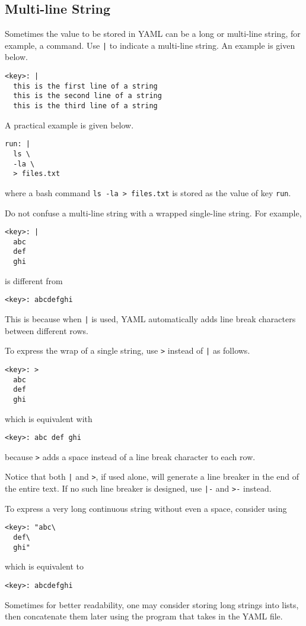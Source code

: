 \subsection{Multi-line String}

Sometimes the value to be stored in YAML can be a long or multi-line string, for example, a command. Use \texttt{|} to indicate a multi-line string. An example is given below.
\begin{lstlisting}
<key>: |
  this is the first line of a string
  this is the second line of a string
  this is the third line of a string
\end{lstlisting}
A practical example is given below.
\begin{lstlisting}
run: |
  ls \
  -la \
  > files.txt
\end{lstlisting}
where a bash command \verb|ls -la > files.txt| is stored as the value of key \verb|run|.

Do not confuse a multi-line string with a wrapped single-line string. For example,
\begin{lstlisting}
<key>: |
  abc
  def
  ghi
\end{lstlisting}
is different from
\begin{lstlisting}
<key>: abcdefghi
\end{lstlisting}
This is because when \texttt{|} is used, YAML automatically adds line break characters between different rows.

To express the wrap of a single string, use \verb|>| instead of \texttt{|} as follows.
\begin{lstlisting}
<key>: >
  abc
  def
  ghi
\end{lstlisting}
which is equivalent with
\begin{lstlisting}
<key>: abc def ghi
\end{lstlisting}
because \verb|>| adds a space instead of a line break character to each row.

Notice that both \texttt{|} and \verb|>|, if used alone, will generate a line breaker in the end of the entire text. If no such line breaker is designed, use \texttt{|-} and \verb|>-| instead.

To express a very long continuous string without even a space, consider using
\begin{lstlisting}
<key>: "abc\
  def\
  ghi"
\end{lstlisting}
which is equivalent to
\begin{lstlisting}
<key>: abcdefghi
\end{lstlisting}
Sometimes for better readability, one may consider storing long strings into lists, then concatenate them later using the program that takes in the YAML file.


